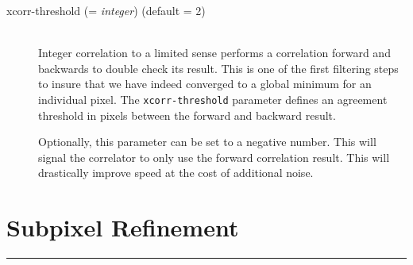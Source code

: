 \begin{description}
\item[xcorr-threshold \textnormal{\small{(= \emph{integer})}} (default = 2)] \hfill \\

  Integer correlation to a limited sense performs a correlation
  forward and backwards to double check its result. This is one of the
  first filtering steps to insure that we have indeed converged to a
  global minimum for an individual pixel. The \texttt{xcorr-threshold}
  parameter defines an agreement threshold in pixels between the
  forward and backward result.

  Optionally, this parameter can be set to a negative number. This
  will signal the correlator to only use the forward correlation
  result. This will drastically improve speed at the cost of
  additional noise.

\end{description}

\section{Subpixel Refinement}
\hrule
\bigskip


